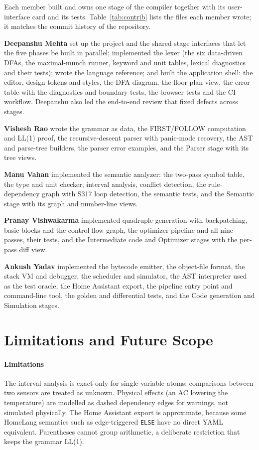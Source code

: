 \documentclass[conference]{IEEEtran}
\newcommand{\code}[1]{\texttt{#1}}
\begin{document}
Each member built and owns one stage of the compiler together with its user-interface card and its tests. Table~\ref{tab:contrib} lists the files each member wrote; it matches the commit history of the repository.


\textbf{Deepanshu Mehta} set up the project and the shared stage interfaces that let the five phases be built in parallel; implemented the lexer (the six data-driven DFAs, the maximal-munch runner, keyword and unit tables, lexical diagnostics and their tests); wrote the language reference; and built the application shell: the editor, design tokens and styles, the DFA diagram, the floor-plan view, the error table with the diagnostics and boundary tests, the browser tests and the CI workflow. Deepanshu also led the end-to-end review that fixed defects across stages.

\textbf{Vishesh Rao} wrote the grammar as data, the FIRST/FOLLOW computation and LL(1) proof, the recursive-descent parser with panic-mode recovery, the AST and parse-tree builders, the parser error examples, and the Parser stage with its tree views.

\textbf{Manu Vahan} implemented the semantic analyzer: the two-pass symbol table, the type and unit checker, interval analysis, conflict detection, the rule-dependency graph with S317 loop detection, the semantic tests, and the Semantic stage with its graph and number-line views.

\textbf{Pranay Vishwakarma} implemented quadruple generation with backpatching, basic blocks and the control-flow graph, the optimizer pipeline and all nine passes, their tests, and the Intermediate code and Optimizer stages with the per-pass diff view.

\textbf{Ankush Yadav} implemented the bytecode emitter, the object-file format, the stack VM and debugger, the scheduler and simulator, the AST interpreter used as the test oracle, the Home Assistant export, the pipeline entry point and command-line tool, the golden and differential tests, and the Code generation and Simulation stages.

\section{Limitations and Future Scope}

\paragraph{Limitations} The interval analysis is exact only for single-variable atoms; comparisons between two sensors are treated as unknown. Physical effects (an AC lowering the temperature) are modelled as dashed dependency edges for warnings, not simulated physically. The Home Assistant export is approximate, because some HomeLang semantics such as edge-triggered \code{ELSE} have no direct YAML equivalent. Parentheses cannot group arithmetic, a deliberate restriction that keeps the grammar LL(1).
\end{document}
